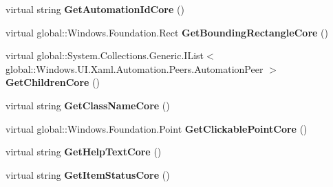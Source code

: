 \begin{DoxyCompactItemize}
virtual string {\bfseries Get\+Automation\+Id\+Core} ()
\item 
\mbox{\label{class_windows_1_1_u_i_1_1_xaml_1_1_automation_1_1_peers_1_1_automation_peer_a3c155bdaac9b35e1c7bb423d47fd707d}} 
virtual global\+::\+Windows.\+Foundation.\+Rect {\bfseries Get\+Bounding\+Rectangle\+Core} ()
\item 
\mbox{\label{class_windows_1_1_u_i_1_1_xaml_1_1_automation_1_1_peers_1_1_automation_peer_a09114f6788a9e206e93a6ffbd12620bf}} 
virtual global\+::\+System.\+Collections.\+Generic.\+I\+List$<$ global\+::\+Windows.\+U\+I.\+Xaml.\+Automation.\+Peers.\+Automation\+Peer $>$ {\bfseries Get\+Children\+Core} ()
\item 
\mbox{\label{class_windows_1_1_u_i_1_1_xaml_1_1_automation_1_1_peers_1_1_automation_peer_a11d5725a1c02165300ffbcf264f7b2b3}} 
virtual string {\bfseries Get\+Class\+Name\+Core} ()
\item 
\mbox{\label{class_windows_1_1_u_i_1_1_xaml_1_1_automation_1_1_peers_1_1_automation_peer_a08e12f22ea4a043975f822abaf961ce4}} 
virtual global\+::\+Windows.\+Foundation.\+Point {\bfseries Get\+Clickable\+Point\+Core} ()
\item 
\mbox{\label{class_windows_1_1_u_i_1_1_xaml_1_1_automation_1_1_peers_1_1_automation_peer_a7a8535136acdad3cca9f8c95a6ecc9e0}} 
virtual string {\bfseries Get\+Help\+Text\+Core} ()
\item 
\mbox{\label{class_windows_1_1_u_i_1_1_xaml_1_1_automation_1_1_peers_1_1_automation_peer_a7531b623b14754b9f333f073e787370c}} 
virtual string {\bfseries Get\+Item\+Status\+Core} ()
\item 
\mbox{\label{class_windows_1_1_u_i_1_1_xaml_1_1_automation_1_1_peers_1_1_automation_peer_ab7e73605b4d6af50ce1e8d3be13f718c}} 

\end{DoxyCompactItemize}

